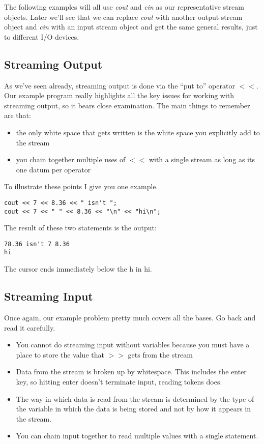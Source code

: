 \documentclass[]{tufte-handout}
\begin{document}
The following examples will all use \textit{cout} and \textit{cin} as our representative stream objects. Later we'll see that we can replace \textit{cout} with another output stream object and \textit{cin} with an input stream object and get the same general results, just to different I/O devices.

\subsection{Streaming Output}

As we've seen already, streaming output is done via the ``put to'' operator \textit{$<<$}. Our example program really highlights all the key issues for working with streaming output, so it bears close examination. The main things to remember are that:
\begin{itemize}
\item the only white space that gets written is the white space you explicitly add to the stream
\item you chain together multiple uses of $<<$ with a single stream as long as its one datum per operator
\end{itemize}
To illustrate these points I give you one example. 
\begin{verbatim}
cout << 7 << 8.36 << " isn't ";
cout << 7 << " " << 8.36 << "\n" << "hi\n";
\end{verbatim}
The result of these two statements is the output:
\begin{verbatim}
78.36 isn't 7 8.36
hi

\end{verbatim}
The cursor ends immediately below the h in hi. 

\subsection{Streaming Input}

Once again, our example problem pretty much covers all the bases. Go back and read it carefully. 
\begin{itemize}
\item You cannot do streaming input without variables because you must have a place to store the value that $>>$ gets from the stream
\item Data from the stream is broken up by whitespace. This includes the enter key, so hitting enter doesn't terminate input, reading tokens does.
\item The way in which data is read from the stream is determined by the type of the variable in which the data is being stored and not by how it appears in the stream. 
\item You can chain input together to read multiple values with a single statement.
\end{itemize}
\end{document}
